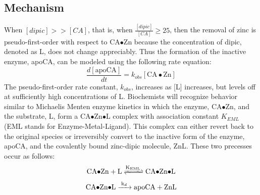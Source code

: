 \subsection{Mechanism}
When $[dipic] >> [CA]$, that is, when $\frac{[dipic]}{[CA]} \ge 25$, then the removal of zinc is pseudo-first-order with respect to CA$\bullet$Zn because the concentration of dipic, denoted as L, does not change appreciably. Thus the formation of the inactive enzyme, apoCA, can be modeled using the following rate equation:
\begin{equation}\label{eqn:a}
\frac{d[\text{apoCA}]}{dt}=k_{obs}[\text{CA$\bullet$Zn}]
\end{equation}
The pseudo-first-order rate constant, $k_{obs}$, increases as [L] increases, but levels off at sufficiently high concentrations of L. Biochemists will recognize behavior similar to Michaelis Menten enzyme kinetics in which the enzyme, CA$\bullet$Zn, and the substrate, L, form a CA$\bullet$Zn$\bullet$L complex with association constant $K_{EML}$ (EML stands for Enzyme-Metal-Ligand). This complex can either revert back to the original species or irreversibly convert to the inactive form of the enzyme, apoCA, and the covalently bound zinc-dipic molecule, ZnL. These two precesses occur as follows:
\begin{align}\label{eqn:KEML_reaction}
\ce{CA$\bullet$Zn + L
<=>[\ce{K_{EML}}]
CA$\bullet$Zn$\bullet$L}
\end{align}
\begin{align}\label{eqn:kd_reaction}
\ce{CA$\bullet$Zn$\bullet$L
->[\ce{k_{d}}]
apoCA + ZnL}
\end{align}